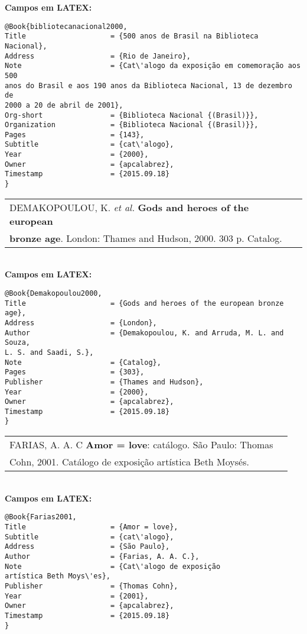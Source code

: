 \textbf{Campos em LATEX:}

\begin{verbatim}
@Book{bibliotecanacional2000,
Title                    = {500 anos de Brasil na Biblioteca Nacional},
Address                  = {Rio de Janeiro},
Note                     = {Cat\'alogo da exposição em comemoração aos 500
anos do Brasil e aos 190 anos da Biblioteca Nacional, 13 de dezembro de
2000 a 20 de abril de 2001},
Org-short                = {Biblioteca Nacional {(Brasil)}},
Organization             = {Biblioteca Nacional {(Brasil)}},
Pages                    = {143},
Subtitle                 = {cat\'alogo},
Year                     = {2000},
Owner                    = {apcalabrez},
Timestamp                = {2015.09.18}
}
\end{verbatim}

\begin{tabular}{|l|c|} \hline
	DEMAKOPOULOU, K. \textit{et al.} \textbf{Gods and heroes of the european}\\ \textbf{bronze age}. London:  Thames and Hudson, 2000. 303 p. Catalog.    \\\hline
\end{tabular}\\

\textbf{Campos em LATEX:}

\begin{verbatim}
@Book{Demakopoulou2000,
Title                    = {Gods and heroes of the european bronze age},
Address                  = {London},
Author                   = {Demakopoulou, K. and Arruda, M. L. and Souza,
L. S. and Saadi, S.},
Note                     = {Catalog},
Pages                    = {303},
Publisher                = {Thames and Hudson},
Year                     = {2000},
Owner                    = {apcalabrez},
Timestamp                = {2015.09.18}
}
\end{verbatim}

\begin{tabular}{|l|c|} \hline
	FARIAS, A. A. C \textbf{Amor = love}: cat\'alogo. São Paulo: Thomas \\ Cohn, 2001. Cat\'alogo de exposição artística Beth Moys\'es.    \\\hline
\end{tabular}\\

\textbf{Campos em LATEX:}

\begin{verbatim}
@Book{Farias2001,
Title                    = {Amor = love},
Subtitle                 = {cat\'alogo},
Address                  = {São Paulo},
Author                   = {Farias, A. A. C.},
Note                     = {Cat\'alogo de exposição
artística Beth Moys\'es},
Publisher                = {Thomas Cohn},
Year                     = {2001},
Owner                    = {apcalabrez},
Timestamp                = {2015.09.18}
}
\end{verbatim}

